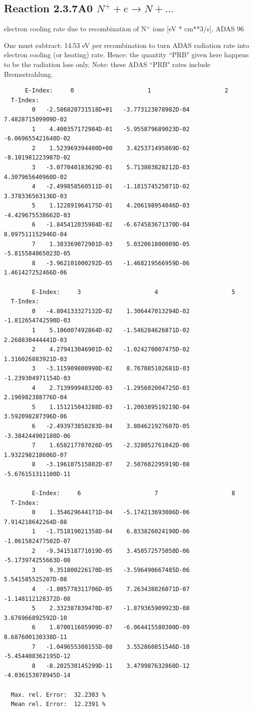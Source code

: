 \documentclass[12pt,dvips]{article}
\begin{document}
\subsection{
  Reaction 2.3.7A0  $N^+ + e \rightarrow N   + ... $
}
electron cooling rate due to recombination of N$^+$ ions [eV *
cm**3/s], ADAS 96

One must subtract: 14.53 eV per recombination to turn ADAS radiation
rate into electron cooling (or heating) rate. Hence: the quantity
``PRB" given here happens to be the radiation loss only. Note: these
ADAS ``PRB" rates include Bremsstrahlung.

\begin{small}\begin{verbatim}
      E-Index:     0                     1                     2
  T-Index:
        0   -2.586820731518D+01   -3.773123878982D-04    7.482871509909D-02
        1    4.400357172984D-01   -5.955879689023D-02   -6.069655421640D-02
        2    1.523969394400D+00    3.425371495869D-02   -8.101981223987D-02
        3   -3.077040183629D-01    5.713803828212D-03    4.307965640960D-02
        4   -2.499858560511D-01   -1.181574525071D-02    3.378336563136D-03
        5    1.122891964175D-01    4.206198954046D-03   -4.429675538662D-03
        6   -1.845412035984D-02   -6.674583671370D-04    8.097511152946D-04
        7    1.383369072901D-03    5.032061800809D-05   -5.815584065023D-05
        8   -3.962101000292D-05   -1.468219566959D-06    1.461427252466D-06

        E-Index:     3                     4                     5
  T-Index:
        0   -4.804133327132D-02    1.306447013294D-02   -1.812654742590D-03
        1    5.106007492864D-02   -1.546284626871D-02    2.268830444441D-03
        2    4.279413046901D-02   -1.024270007475D-02    1.316026883921D-03
        3   -3.115909800990D-02    8.767085102681D-03   -1.239304971154D-03
        4    2.713999948320D-03   -1.295602004725D-03    2.196982388776D-04
        5    1.151215043288D-03   -1.200389519219D-04    3.592098287396D-06
        6   -2.493973858283D-04    3.804621927607D-05   -3.384244902180D-06
        7    1.658217707026D-05   -2.328052761042D-06    1.932298218606D-07
        8   -3.196107515802D-07    2.507602295919D-08   -5.676151311100D-11

        E-Index:     6                     7                     8
  T-Index:
        0    1.354629644171D-04   -5.174213693006D-06    7.914218642264D-08
        1   -1.751819021358D-04    6.833826024190D-06   -1.061582477502D-07
        2   -9.341518771019D-05    3.450572575050D-06   -5.173974255663D-08
        3    9.351800226170D-05   -3.596490667485D-06    5.541585525207D-08
        4   -1.805778311706D-05    7.263438826071D-07   -1.148112128372D-08
        5    2.332387839470D-07   -1.879365909923D-08    3.676966892592D-10
        6    1.870011605909D-07   -6.064415580300D-09    8.687600130338D-11
        7   -1.049655308155D-08    3.552860851546D-10   -5.454408362195D-12
        8   -8.202530145299D-11    3.479987632860D-12   -4.036153078945D-14

  Max. rel. Error:  32.2303 %
  Mean rel. Error:  12.2391 %

\end{verbatim}\end{small}
\end{document}
